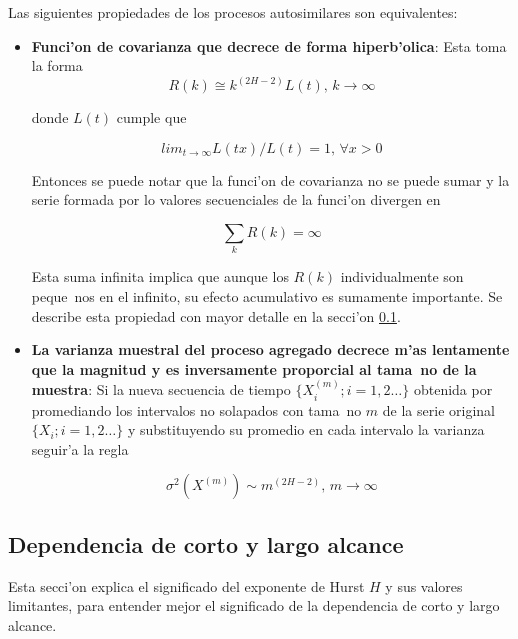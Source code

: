 Las siguientes propiedades de los procesos autosimilares son equivalentes:

\begin{itemize}
\item {\bf Funci'on de covarianza que decrece de forma hiperb'olica}: Esta toma la forma
\begin{equation}
R(k) \cong k^{(2H-2)}L(t) \text{,  } k \to \infty
\end{equation}

donde $L(t)$ cumple que

\begin{equation}
lim_{t \to \infty} L(tx)/L(t) = 1 \text{,  } \forall x > 0
\end{equation}

Entonces se puede notar que la funci'on de covarianza no se puede sumar y la
serie formada por lo valores secuenciales de la funci'on divergen en

\begin{equation}
\sum_{k}{R(k)} = \infty
\end{equation}

Esta suma infinita implica que aunque los $R(k)$ individualmente son peque~nos
en el infinito, su efecto acumulativo es sumamente importante. Se describe esta
propiedad con mayor detalle en la secci'on \ref{subsect:lsrd}.

\item {\bf La varianza muestral del proceso agregado decrece m'as lentamente
que la magnitud y es inversamente proporcial al tama~no de la muestra}: Si 
la nueva secuencia de tiempo $\{ X_{i}^{(m)} ; i = 1,2 \ldots\}$ obtenida por
promediando los intervalos no solapados con tama~no $m$ de la serie original
$\{ X_i ; i = 1,2 \ldots \}$ y substituyendo su promedio en cada intervalo
la varianza seguir'a la regla

\begin{equation}
\sigma^2(X^{(m)}) \sim m^{(2H-2)} \text{,  } m \to \infty
\end{equation}

\end{itemize}

\subsection{Dependencia de corto y largo alcance} \label{subsect:lsrd}

Esta secci'on explica el significado del exponente de Hurst $H$ y sus valores
limitantes, para entender mejor el significado de la dependencia de corto y
largo alcance.

